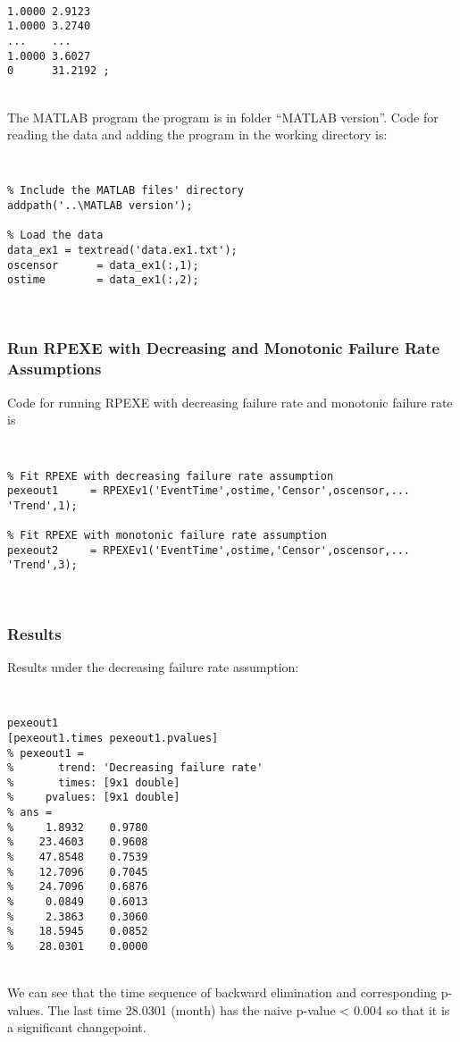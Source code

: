 \documentclass[12pt] {article}
\newenvironment{boxit}{\begin{lrbox}{\savepar}
\begin{minipage}[b]{5.5in}}
{\end{minipage}\end{lrbox}\fbox{\usebox{\savepar}}}
\begin{document}
\begin{boxit} {\tt
\noindent
\begin{verbatim}
1.0000 2.9123
1.0000 3.2740
...    ...
1.0000 3.6027
0      31.2192 ;
\end{verbatim}}
\end{boxit} \\

The MATLAB program the program is in
folder ``MATLAB version''. Code for reading the data and adding the program in the working directory is:

\begin{boxit} {\tt
\noindent
\begin{verbatim}
% Include the MATLAB files' directory
addpath('..\MATLAB version');

% Load the data
data_ex1 = textread('data.ex1.txt');
oscensor      = data_ex1(:,1);
ostime        = data_ex1(:,2);
\end{verbatim}}
\end{boxit} \\

\subsubsection{Run RPEXE with Decreasing and Monotonic Failure Rate Assumptions}

Code for running RPEXE with decreasing failure rate and monotonic failure rate is

\begin{boxit} {\tt
\noindent
\begin{verbatim}
% Fit RPEXE with decreasing failure rate assumption
pexeout1     = RPEXEv1('EventTime',ostime,'Censor',oscensor,...
'Trend',1);

% Fit RPEXE with monotonic failure rate assumption
pexeout2     = RPEXEv1('EventTime',ostime,'Censor',oscensor,...
'Trend',3);
\end{verbatim}}
\end{boxit} \\

\newpage
\subsubsection{Results}
Results under the decreasing failure rate assumption:

\begin{boxit} {\tt
\noindent
\begin{verbatim}
pexeout1
[pexeout1.times pexeout1.pvalues]
% pexeout1 =
%       trend: 'Decreasing failure rate'
%       times: [9x1 double]
%     pvalues: [9x1 double]
% ans =
%     1.8932    0.9780
%    23.4603    0.9608
%    47.8548    0.7539
%    12.7096    0.7045
%    24.7096    0.6876
%     0.0849    0.6013
%     2.3863    0.3060
%    18.5945    0.0852
%    28.0301    0.0000
\end{verbatim}}
\end{boxit} \\
We can see that the time sequence of backward elimination and corresponding p-values. The last time 28.0301 (month) has the naive p-value < 0.004 so that it is a significant changepoint.
\newpage
\end{document}
